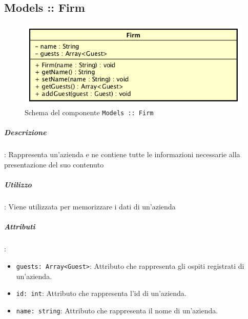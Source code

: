 \documentclass[../ManualeSviluppatore_v1.0.0.tex]{subfiles}
\begin{document}
\newpage
	\subsection{Models :: Firm}
	\begin{figure}[!h]
		\centering
		\includegraphics[scale=0.6]{Architettura/Front-End/Models/Firm.png}
		\caption{Schema del componente \texttt{Models :: Firm}}
	\end{figure}

		
		\subparagraph{Descrizione}: Rappresenta un'azienda e ne contiene tutte le informazioni necessarie alla presentazione del suo contenuto
		
		\subparagraph{Utilizzo}: Viene utilizzata per memorizzare i dati di un'azienda
		
		\subparagraph{Attributi}:
		      \begin{itemize}
		      	\item \texttt{guests: Array<Guest>}:
		      	      Attributo che rappresenta gli ospiti registrati di un'azienda.
		      	\item \texttt{id: int}:
		      	      Attributo che rappresenta l'id di un'azienda.
		      	\item \texttt{name: string}:
		      	      Attributo che rappresenta il nome di un'azienda.
		      \end{itemize}
		
\end{document}
